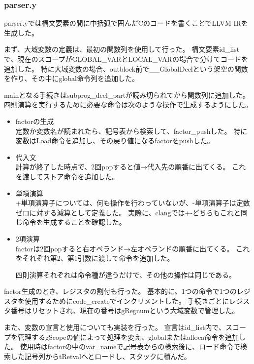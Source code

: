 \subsubsection{parser.y}
parser.yでは構文要素の間に中括弧で囲んだCのコードを書くことでLLVM IRを生成した。

まず、大域変数の定義は、最初の関数列を使用して行った。
構文要素id\_listで、現在のスコープがGLOBAL\_VARとLOCAL\_VARの場合で分けてコードを追加した。
特に大域変数の場合、outblock前で\_\_GlobalDeclという架空の関数を作り、その中にglobal命令列を追加した。

mainとなる手続きはsubprog\_decl\_partが読み切られてから関数列に追加した。\\

四則演算を実行するために必要な命令は次のような操作で生成するようにした。
\begin{itemize}
  \item factorの生成\\
        定数か変数名が読まれたら、記号表から検索して、factor\_pushした。
        特に変数はLoad命令を追加し、その戻り値になるfactorをpushした。
  \item 代入文\\
        計算が終了した時点で、2回popすると値→代入先の順番に出てくる。
        これを渡してストア命令を追加した。
  \item 単項演算\\
        +単項演算子については、何も操作を行わっていないが、-単項演算子は定数ゼロに対する減算として定義した。
        実際に、clangでは+-どちらもこれと同じ命令を生成することを確認した。
  \item 2項演算\\
        factorは2回popすると右オペランド→左オペランドの順番に出てくる。
        これをそれぞれ第2、第1引数に渡して命令を追加した。

        四則演算それぞれは命令種が違うだけで、その他の操作は同じである。
\end{itemize}

factor生成のとき、レジスタの割付も行った。
基本的に、1つの命令で1つのレジスタを使用するためにcode\_createでインクリメントした。
手続きごとにレジスタ番号はリセットされ、現在の番号はgRegnumという大域変数で管理した。

また、変数の宣言と使用についても実装を行った。
宣言はid\_list内で、スコープを管理するgScopeの値によって処理を変え、globalまたはalloca命令を追加した。
使用時はfactorの中のvar\_nameで記号表からの検索後に、ロード命令で検索した記号列からtRetvalへとロードし、スタックに積んだ。

